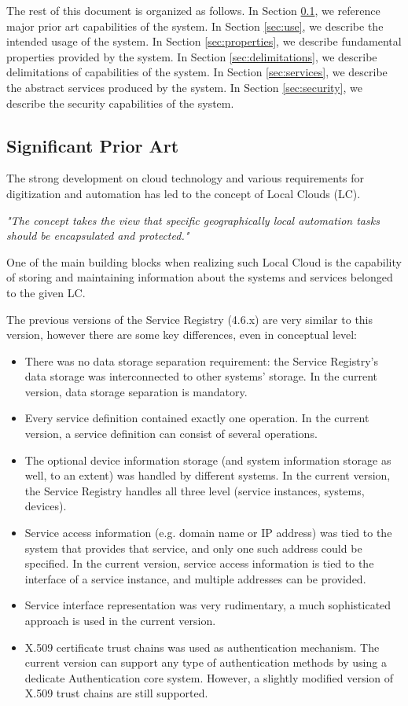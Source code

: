 \documentclass[a4paper]{arrowhead}
\begin{document}
The rest of this document is organized as follows.
In Section \ref{sec:prior_art}, we reference major prior art capabilities
of the system.
In Section \ref{sec:use}, we describe the intended usage of the system.
In Section \ref{sec:properties}, we describe fundamental properties
provided by the system.
In Section \ref{sec:delimitations}, we describe delimitations of capabilities
of the system.
In Section \ref{sec:services}, we describe the abstract services produced by the system.
In Section \ref{sec:security}, we describe the security capabilities
of the system.

\subsection{Significant Prior Art}
\label{sec:prior_art}

The strong development on cloud technology and various requirements for digitization and automation has led to the concept of Local Clouds (LC).

\textit{"The concept takes the view that specific geographically local automation tasks should be encapsulated and protected."} \cite{jerker2017localclouds}

One of the main building blocks when realizing such Local Cloud is the capability of storing and maintaining information about the systems and services belonged to the given LC.

The previous versions of the Service Registry (4.6.x) are very similar to this version, however there are some key differences, even in conceptual level:

\begin{itemize}
    \item There was no data storage separation requirement: the Service Registry's data storage was interconnected to other systems' storage. In the current version, data storage separation is mandatory.
    \item Every service definition contained exactly one operation. In the current version, a service definition can consist of several operations.
    \item The optional device information storage (and system information storage as well, to an extent) was handled by different systems. In the current version, the Service Registry handles all three level (service instances, systems, devices).
    \item Service access information (e.g. domain name or IP address) was tied to the system that provides that service, and only one such address could be specified. In the current version, service access information is tied to the interface of a service instance, and multiple addresses can be provided.
    \item Service interface representation was very rudimentary, a much sophisticated approach is used in the current version.
    \item X.509 certificate trust chains was used as authentication mechanism. The current version can support any type of authentication methods by using a dedicate Authentication core system. However, a slightly modified version of X.509 trust chains are still supported.
\end{itemize}
\end{document}
